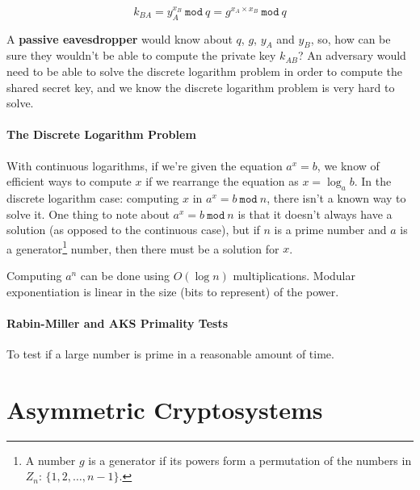 \documentclass[12pt, letterpaper]{article}
\begin{document}
\[
  k_{BA} = y_A^{x_B} \: \mathtt{mod} \: q = g^{x_A \times x_B} \: \mathtt{mod} \: q
\]

A \textbf{passive eavesdropper} would know about $q$, $g$, $y_A$ and $y_B$, so, how can be sure they wouldn't be able to compute the private key $k_{AB}$?
An adversary would need to be able to solve the discrete logarithm problem in order to compute the shared secret key, and we know the discrete logarithm problem is very hard to solve.

\paragraph{The Discrete Logarithm Problem} With continuous logarithms, if we're given the equation $a^x = b$, we know of efficient ways to compute $x$ if we rearrange the equation as $x = \log_a b$.
In the discrete logarithm case: computing $x$ in $a^x = b \: \mathtt{mod} \: n$, there isn't a known way to solve it.
One thing to note about $a^x = b \: \mathtt{mod} \: n$ is that it doesn't always have a solution (as opposed to the continuous case), but if $n$ is a prime number and $a$ is a generator\footnote{A number $g$ is a generator if its powers form a permutation of the numbers in $Z_n$: $\lbrace 1, 2, \dots, n-1 \rbrace$.} number, then there must be a solution for $x$.

Computing $a^n$ can be done using $O(\log n)$ multiplications.
Modular exponentiation is linear in the size (bits to represent) of the power.

\paragraph{Rabin-Miller and AKS Primality Tests} To test if a large number is prime in a reasonable amount of time.


\section{Asymmetric Cryptosystems}
\end{document}
